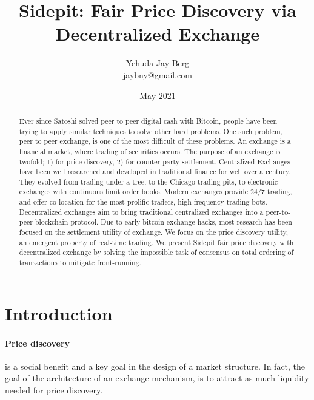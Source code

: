 \documentclass[12pt]{article}
\title{Sidepit: Fair Price Discovery via Decentralized Exchange}
\author{Yehuda Jay Berg \\jaybny@gmail.com}
\date{May 2021}
\begin{document}
\parindent 0cm
\parskip   6pt
\maketitle




\begin{abstract}
Ever since Satoshi solved peer to peer digital cash with Bitcoin, people have been trying to apply similar techniques to solve other hard problems. One such problem, peer to peer exchange, is one of the most difficult of these problems. An exchange is a financial market, where trading of securities occurs. The purpose of an exchange is twofold; 1) for price discovery, 2) for counter-party settlement. Centralized Exchanges have been well researched and developed in traditional finance for well over a century. They evolved from trading under a tree, to the Chicago trading pits, to electronic exchanges with continuous limit order books. Modern exchanges provide 24/7 trading, and offer co-location for the most prolific traders, high frequency trading bots. Decentralized exchanges aim to bring traditional centralized exchanges into a peer-to-peer blockchain protocol. Due to early bitcoin exchange hacks, most research has been focused on the settlement utility of exchange. We focus on the price discovery utility, an emergent property of real-time trading. We present Sidepit fair price discovery with decentralized exchange by solving the impossible task of consensus on total ordering of transactions to mitigate front-running. 
\end{abstract}

\section*{Introduction}

\paragraph*{Price discovery}is a social benefit and a key goal in the design of a market structure. In fact, the goal of the architecture of an exchange mechanism, is to attract as much liquidity needed for price discovery.  \cite{francioni_schwartz_2017}
\end{document}
